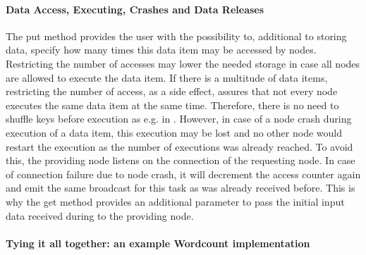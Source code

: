 \paragraph{Data Access, Executing, Crashes and Data Releases}
The put method provides the user with the possibility to, additional to storing data, specify how many times this data item may be accessed by nodes. Restricting the number of accesses may lower the needed storage in case all nodes are allowed to execute the data item. If there is a multitude of data items, restricting the number of access, as a side effect, assures that not every node executes the same data item at the same time. Therefore, there is no need to shuffle keys before execution as e.g. in \cite{Steffenel2015}. However, in case of a node crash during execution of a data item, this execution may be lost and no other node would restart the execution as the number of executions was already reached. To avoid this, the providing node listens on the connection of the requesting node. In case of connection failure due to node crash, it will decrement the access counter again and emit the same broadcast for this task as was already received before. This is why the get method provides an additional parameter to pass the initial input data received during to the providing node. 

\paragraph{Tying it all together: an example Wordcount implementation}
 
